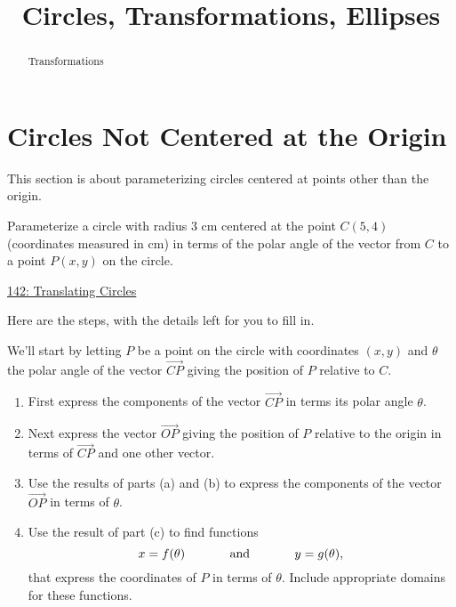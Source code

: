 \documentclass{ximera}
\title{Circles, Transformations, Ellipses}
\begin{document}
\begin{abstract}
Transformations
\end{abstract}
\maketitle


\section{Circles Not Centered at the Origin}
This section is about parameterizing circles centered at points other than the origin.

\begin{question}  \label{Ex:sdfdsfdfL}

Parameterize a circle with radius $3$ cm centered at the point $C(5,4)$ (coordinates measured in cm) in terms of the polar angle of the vector from $C$ to a point $P(x,y)$ on the circle.

\begin{onlineOnly}
    \begin{center}
\end{center}
\end{onlineOnly}

\href{https://www.desmos.com/calculator/pcndel98wg}{142: Translating Circles}


\begin{explanation} 

Here are the steps, with the details left for you to fill in.

We'll start by letting $P$ be a point on the circle with coordinates $(x,y)$ and $\theta$ the polar angle of the vector $\overrightarrow{CP}$ giving the position of $P$ relative to $C$.

\begin{enumerate}
\item First express the components of the vector $\overrightarrow{CP}$ in terms its polar angle $\theta$.

\item Next express the vector $\overrightarrow{OP}$ giving the position of $P$ relative to the origin in terms of $\overrightarrow{CP}$ and one other vector.

\item Use the results of parts (a) and (b) to express the components of the vector $\overrightarrow{OP}$ in terms of $\theta$.

\item Use the result of part (c) to find functions
\[
    x = f(\theta)  \hskip 0.5 in \text{and} \hskip 0.5in  y=g(\theta) ,
\]
that express the coordinates of $P$ in terms of $\theta$. Include appropriate domains for these functions. 


\end{enumerate}
\end{explanation}
\end{question}
\end{document}
